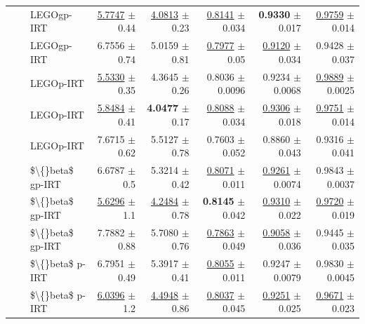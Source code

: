 \begin{longtable}{llp{}rrrrr}
 &  & LEGOgp-IRT & \underline{5.7747} {\scriptsize $\pm$ 0.44} & \underline{4.0813} {\scriptsize $\pm$ 0.23} & \underline{0.8141} {\scriptsize $\pm$ 0.034} & \textbf{0.9330} {\scriptsize $\pm$ 0.017} & \underline{0.9759} {\scriptsize $\pm$ 0.014} \\
 &  & LEGOgp-IRT & 6.7556 {\scriptsize $\pm$ 0.74} & 5.0159 {\scriptsize $\pm$ 0.81} & \underline{0.7977} {\scriptsize $\pm$ 0.05} & \underline{0.9120} {\scriptsize $\pm$ 0.034} & 0.9428 {\scriptsize $\pm$ 0.037} \\
 &  & LEGOp-IRT & \underline{5.5330} {\scriptsize $\pm$ 0.35} & 4.3645 {\scriptsize $\pm$ 0.26} & 0.8036 {\scriptsize $\pm$ 0.0096} & 0.9234 {\scriptsize $\pm$ 0.0068} & \underline{0.9889} {\scriptsize $\pm$ 0.0025} \\
 &  & LEGOp-IRT & \underline{5.8484} {\scriptsize $\pm$ 0.41} & \textbf{4.0477} {\scriptsize $\pm$ 0.17} & \underline{0.8088} {\scriptsize $\pm$ 0.034} & \underline{0.9306} {\scriptsize $\pm$ 0.018} & \underline{0.9751} {\scriptsize $\pm$ 0.014} \\
 &  & LEGOp-IRT & 7.6715 {\scriptsize $\pm$ 0.62} & 5.5127 {\scriptsize $\pm$ 0.78} & 0.7603 {\scriptsize $\pm$ 0.052} & 0.8860 {\scriptsize $\pm$ 0.043} & 0.9316 {\scriptsize $\pm$ 0.041} \\
 &  & \$\textbackslash\{\}beta\$ gp-IRT & 6.6787 {\scriptsize $\pm$ 0.5} & 5.3214 {\scriptsize $\pm$ 0.42} & \underline{0.8071} {\scriptsize $\pm$ 0.011} & \underline{0.9261} {\scriptsize $\pm$ 0.0074} & 0.9843 {\scriptsize $\pm$ 0.0037} \\
 &  & \$\textbackslash\{\}beta\$ gp-IRT & \underline{5.6296} {\scriptsize $\pm$ 1.1} & \underline{4.2484} {\scriptsize $\pm$ 0.78} & \textbf{0.8145} {\scriptsize $\pm$ 0.042} & \underline{0.9310} {\scriptsize $\pm$ 0.022} & \underline{0.9720} {\scriptsize $\pm$ 0.019} \\
 &  & \$\textbackslash\{\}beta\$ gp-IRT & 7.7882 {\scriptsize $\pm$ 0.88} & 5.7080 {\scriptsize $\pm$ 0.76} & \underline{0.7863} {\scriptsize $\pm$ 0.049} & \underline{0.9058} {\scriptsize $\pm$ 0.036} & 0.9445 {\scriptsize $\pm$ 0.035} \\
 &  & \$\textbackslash\{\}beta\$ p-IRT & 6.7951 {\scriptsize $\pm$ 0.49} & 5.3917 {\scriptsize $\pm$ 0.41} & \underline{0.8055} {\scriptsize $\pm$ 0.011} & 0.9247 {\scriptsize $\pm$ 0.0079} & 0.9830 {\scriptsize $\pm$ 0.0045} \\
 &  & \$\textbackslash\{\}beta\$ p-IRT & \underline{6.0396} {\scriptsize $\pm$ 1.2} & \underline{4.4948} {\scriptsize $\pm$ 0.86} & \underline{0.8037} {\scriptsize $\pm$ 0.045} & \underline{0.9251} {\scriptsize $\pm$ 0.025} & \underline{0.9671} {\scriptsize $\pm$ 0.023} \\

\end{longtable}
